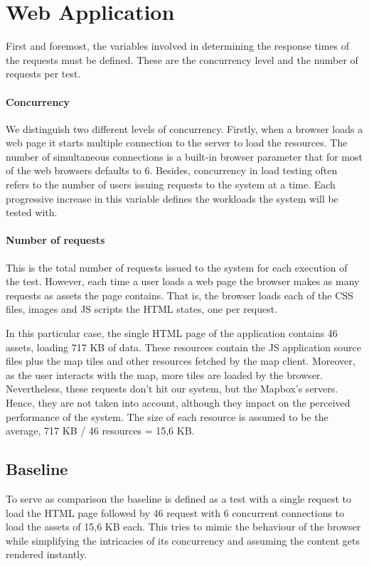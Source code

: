 \section{Web Application}

First and foremost, the variables involved in determining the response times of the requests must be defined. These are the concurrency level and the number of requests per test.

\paragraph{Concurrency} We distinguish two different levels of concurrency. Firstly, when a browser loads a web page it starts multiple connection to the server to load the resources. The number of simultaneous connections is a built-in browser parameter that for most of the web browsers defaults to 6. Besides, concurrency in load testing often refers to the number of users issuing requests to the system at a time. Each progressive increase in this variable defines the workloads the system will be tested with.

\paragraph{Number of requests} This is the total number of requests issued to the system for each execution of the test. However, each time a user loads a web page the browser makes as many requests as assets the page contains. That is, the browser loads each of the CSS files, images and JS scripts the HTML states, one per request.

In this particular case, the single HTML page of the application contains 46 assets, loading 717 KB of data. These resources contain the JS application source files plus the map tiles and other resources fetched by the map client. Moreover, as the user interacts with the map, more tiles are loaded by the browser. Nevertheless, these requests don't hit our system, but the Mapbox's servers. Hence, they are not taken into account, although they impact on the perceived performance of the system. The size of each resource is assumed to be the average, 717 KB / 46 resources = 15,6 KB.

\subsection*{Baseline}

To serve as comparison the baseline is defined as a test with a single request to load the HTML page followed by 46 request with 6 concurrent connections to load the assets of 15,6 KB each. This tries to mimic the behaviour  of the browser while simplifying the intricacies of its concurrency and assuming the content gets rendered instantly.

